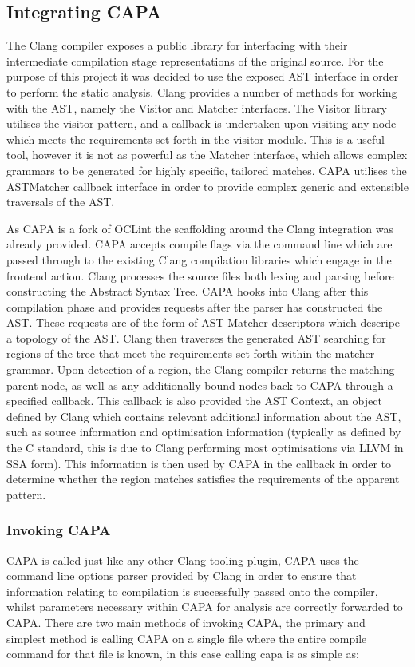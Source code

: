 \subsection{Integrating CAPA}\label{integrating_capa}
The Clang compiler exposes a public library for interfacing with their intermediate
compilation stage representations of the original source. For the purpose of this project it was
decided to use the exposed AST interface in order to perform the static analysis. Clang provides a
number of methods for working with the AST, namely the Visitor and Matcher interfaces. The Visitor
library utilises the visitor pattern, and a callback is undertaken upon visiting any node which
meets the requirements set forth in the visitor module. This is a useful tool, however it is not as
powerful as the Matcher interface, which allows complex grammars to be generated for highly
specific, tailored matches. CAPA utilises the ASTMatcher callback interface in order to provide complex
generic and extensible traversals of the AST. 


As CAPA is a fork of OCLint\cite{oclint} the scaffolding around the Clang integration was already
provided. CAPA accepts compile flags via the command line which are passed through to the existing
Clang compilation libraries which engage in the frontend action. Clang processes the source files
both lexing and parsing before constructing the Abstract Syntax Tree. CAPA hooks into Clang after
this compilation phase and provides requests after the parser has constructed the AST. These
requests are of the form of AST Matcher descriptors which descripe a topology of the AST. Clang then
traverses the generated AST searching for regions of the tree that meet the requirements set forth
within the matcher grammar. Upon detection of a region, the Clang compiler returns the matching
parent node, as well as any additionally bound nodes back to CAPA through a specified callback. This
callback is also provided the AST Context, an object defined by Clang which contains relevant
additional information about the AST, such as source information and optimisation information
(typically as defined by the C standard, this is due to Clang performing most optimisations via LLVM
in SSA form). This information is then used by CAPA in the callback in order to determine whether
the region matches satisfies the requirements of the apparent pattern.

\subsubsection{Invoking CAPA}
CAPA is called just like any other Clang tooling plugin, CAPA uses the command line options parser
provided by Clang in order to ensure that information relating to compilation is successfully passed
onto the compiler, whilst parameters necessary within CAPA for analysis are correctly forwarded to
CAPA. There are two main methods of invoking CAPA, the primary and simplest method is calling CAPA
on a single file where the entire compile command for that file is known, in this case calling capa
is as simple as:

